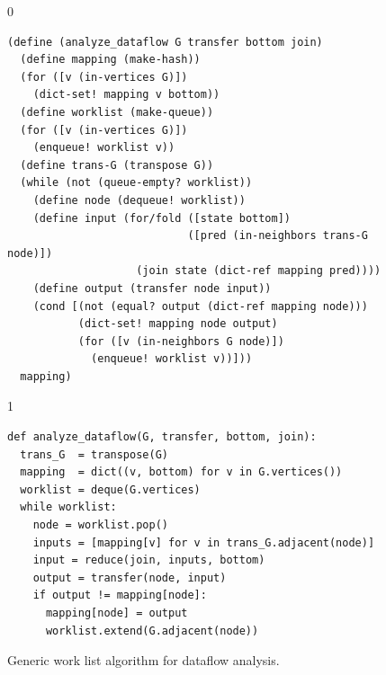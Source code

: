 \documentclass[7x10]{TimesAPriori_MIT}%
\def\racketEd{0}
\def\pythonEd{1}
\providecommand{\BookEdition}{1}
\let\edition\BookEdition
\newcommand{\pythonColor}[0]{}
\numberwithin{theorem}{chapter}
\numberwithin{definition}{chapter}
\numberwithin{equation}{chapter}
\begin{document}
\begin{figure}[tb]
\begin{tcolorbox}[colback=white]  
{\if\edition\racketEd    
\begin{lstlisting}
(define (analyze_dataflow G transfer bottom join)
  (define mapping (make-hash))
  (for ([v (in-vertices G)])
    (dict-set! mapping v bottom))
  (define worklist (make-queue))
  (for ([v (in-vertices G)])
    (enqueue! worklist v))
  (define trans-G (transpose G))
  (while (not (queue-empty? worklist))
    (define node (dequeue! worklist)) 
    (define input (for/fold ([state bottom])
                            ([pred (in-neighbors trans-G node)])
                    (join state (dict-ref mapping pred))))
    (define output (transfer node input))
    (cond [(not (equal? output (dict-ref mapping node)))
           (dict-set! mapping node output)
           (for ([v (in-neighbors G node)])
             (enqueue! worklist v))]))
  mapping)
\end{lstlisting}
\fi}
{\if\edition\pythonEd\pythonColor
\begin{lstlisting}
def analyze_dataflow(G, transfer, bottom, join):
  trans_G  = transpose(G)
  mapping  = dict((v, bottom) for v in G.vertices())
  worklist = deque(G.vertices)
  while worklist:
    node = worklist.pop()
    inputs = [mapping[v] for v in trans_G.adjacent(node)]
    input = reduce(join, inputs, bottom)
    output = transfer(node, input)
    if output != mapping[node]:
      mapping[node] = output
      worklist.extend(G.adjacent(node))
\end{lstlisting}
\fi}
\end{tcolorbox}

\caption{Generic work list algorithm for dataflow analysis.}
  \label{fig:generic-dataflow}
\end{figure}
\end{document}
